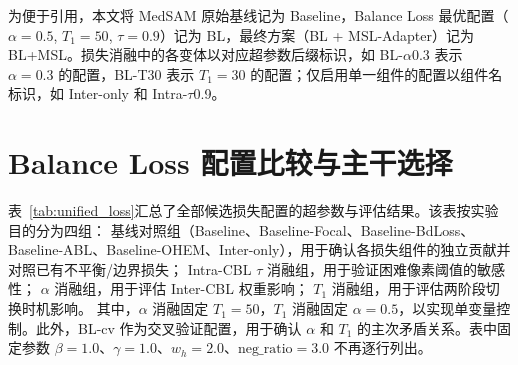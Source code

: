 为便于引用，本文将 MedSAM 原始基线记为 Baseline，Balance Loss 最优配置（$\alpha{=}0.5$, $T_1{=}50$, $\tau{=}0.9$）记为 BL，最终方案（BL + MSL-Adapter）记为 BL+MSL。损失消融中的各变体以对应超参数后缀标识，如 BL-$\alpha$0.3 表示 $\alpha{=}0.3$ 的配置，BL-T30 表示 $T_1{=}30$ 的配置；仅启用单一组件的配置以组件名标识，如 Inter-only 和 Intra-$\tau$0.9。

\section{Balance Loss 配置比较与主干选择}

表~\ref{tab:unified_loss}汇总了全部候选损失配置的超参数与评估结果。该表按实验目的分为四组：  
基线对照组（Baseline、Baseline-Focal、Baseline-BdLoss、Baseline-ABL、Baseline-OHEM、Inter-only），用于确认各损失组件的独立贡献并对照已有不平衡/边界损失；  
Intra-CBL $\tau$ 消融组，用于验证困难像素阈值的敏感性；
$\alpha$ 消融组，用于评估 Inter-CBL 权重影响；  
$T_1$ 消融组，用于评估两阶段切换时机影响。  
其中，$\alpha$ 消融固定 $T_1{=}50$，$T_1$ 消融固定 $\alpha{=}0.5$，以实现单变量控制。此外，BL-cv 作为交叉验证配置，用于确认 $\alpha$ 和 $T_1$ 的主次矛盾关系。表中固定参数 $\beta=1.0$、$\gamma=1.0$、$w_h=2.0$、$\text{neg\_ratio}=3.0$ 不再逐行列出。

